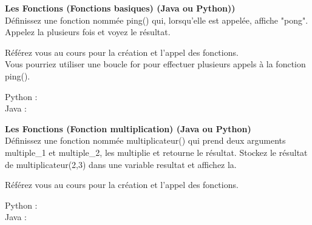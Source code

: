\begin{Exercice}[20 minutes] \textbf{Les Fonctions (Fonctions basiques) (Java ou Python))}\\
  Définissez une fonction nommée ping() qui, lorsqu'elle est appelée, affiche "pong". Appelez la plusieurs fois et voyez le résultat.  \\
   
    \begin{conseil}
		Référez vous au cours pour la création et l'appel des fonctions. \\
      	
      	Vous pourriez utiliser une boucle for pour effectuer plusieurs appels à la fonction ping().
        
    \end{conseil}
    \begin{solution}
    
    Python : \\
    
    
    
    Java : \\
    
    
           
    \end{solution}   
\end{Exercice}

\begin{Exercice}[20 minutes] \textbf{Les Fonctions (Fonction multiplication) (Java ou Python)}\\
   Définissez une fonction nommée multiplicateur() qui prend deux arguments multiple\_1 et multiple\_2, les multiplie et retourne le résultat. Stockez le résultat de multiplicateur(2,3) dans une variable resultat et affichez la.   \\
   
    \begin{conseil}
      	Référez vous au cours pour la création et l'appel des fonctions.
        
    \end{conseil}
    \begin{solution}
    
    Python : \\
    
    
    
    Java : \\
    
    
           
    \end{solution}   
\end{Exercice}

